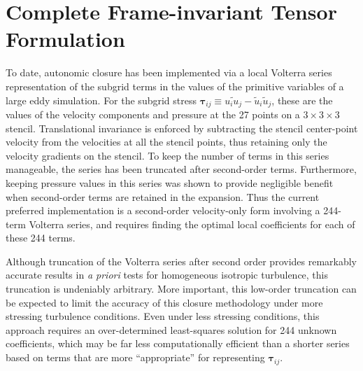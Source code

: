 \graphicspath{ {./Ch9/}  } 

\chapter{Complete Frame-invariant Tensor Formulation}

To date, autonomic closure has been implemented via a local Volterra series representation of the subgrid terms in the values of the primitive variables of a large eddy simulation.  For the subgrid stress $\mathbf{\tau}_{ij} \equiv \widetilde{u_i u_j} - \widetilde{u}_i \widetilde{u}_j$, these are the values of the velocity components and pressure at the 27 points on a $3 \times 3 \times 3$  stencil. Translational invariance is enforced by subtracting the stencil center-point velocity from the velocities at all the stencil points, thus retaining only the velocity gradients on the stencil. To keep the number of terms in this series manageable, the series has been truncated after second-order terms. Furthermore, keeping pressure values in this series was shown to provide negligible benefit when second-order terms are retained in the expansion. Thus the current preferred implementation is a second-order velocity-only form involving a 244-term Volterra series, and requires finding the optimal local coefficients for each of these 244 terms. 

Although truncation of the Volterra series after second order provides remarkably accurate results in \textit{a priori} tests for homogeneous isotropic turbulence, this truncation is undeniably arbitrary. More important, this low-order truncation can be expected to limit the accuracy of this closure methodology under more stressing turbulence conditions. Even under less stressing conditions, this approach requires an over-determined least-squares solution for 244 unknown coefficients, which may be far less computationally efficient than a shorter series based on terms that are more ``appropriate'' for representing $\mathbf{\tau}_{ij}$. 

